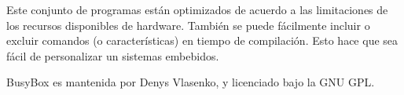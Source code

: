 Este conjunto de programas están optimizados de acuerdo a las limitaciones de los recursos disponibles de hardware. También se puede fácilmente incluir o excluir comandos (o características) en tiempo de compilación. Esto hace que sea fácil de personalizar un sistemas embebidos. 


BusyBox es mantenida por Denys Vlasenko, y licenciado bajo la GNU GPL.


			
 			
 
